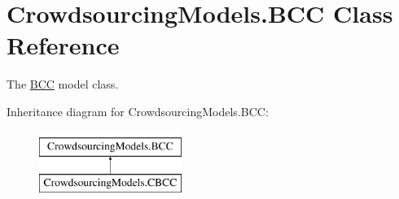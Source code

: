 \hypertarget{class_crowdsourcing_models_1_1_b_c_c}{}\section{Crowdsourcing\+Models.\+B\+C\+C Class Reference}
\label{class_crowdsourcing_models_1_1_b_c_c}


The \hyperlink{class_crowdsourcing_models_1_1_b_c_c}{B\+C\+C} model class.  


Inheritance diagram for Crowdsourcing\+Models.\+B\+C\+C\+:\begin{figure}[H]
\begin{center}
\leavevmode
\includegraphics[height=2.000000cm]{class_crowdsourcing_models_1_1_b_c_c}
\end{center}
\end{figure}
